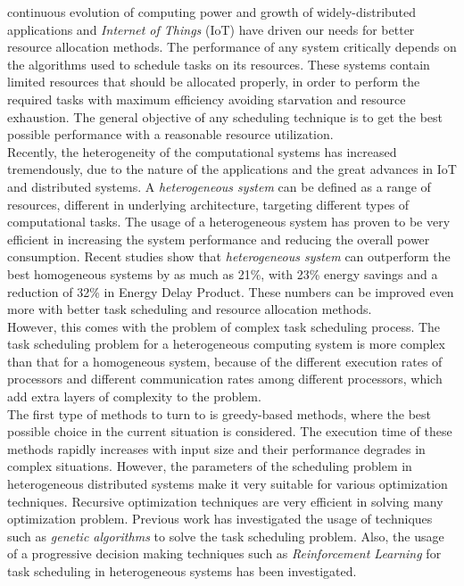  continuous evolution of computing power and growth of widely-distributed applications and \emph{Internet of Things} (IoT) \cite{inproceedings} have driven our needs for better resource allocation methods. 
The performance of any system critically depends on the algorithms used to schedule tasks on its resources. These systems contain limited resources that should be allocated properly, in order to perform the required tasks with maximum efficiency avoiding starvation and resource exhaustion. 
The general objective of any scheduling technique is to get the best possible performance with a reasonable resource utilization. \\ 

Recently, the heterogeneity of the computational systems has increased tremendously, due to the nature of the applications and the great advances in IoT and distributed systems. A \emph{heterogeneous system} can be defined as a range of resources, different in underlying architecture, targeting different types of computational tasks. The usage of a heterogeneous system has proven to be very efficient in increasing the system performance and reducing the overall power consumption. Recent studies \cite{venkat2014harnessing} show that \emph{heterogeneous system} can outperform the best homogeneous systems by as much as 21\%, with 23\% energy savings and
a reduction of 32\% in Energy Delay Product. These numbers can be improved even more with better task scheduling and resource allocation methods. \\

However, this comes with the problem of complex task scheduling process. The task scheduling problem for a heterogeneous computing system is more complex than that for a homogeneous system, because of the different execution rates of processors and different communication rates among different processors, which add extra layers of complexity to the problem. \\

The first type of methods to turn to is greedy-based methods, where the best possible choice in the current situation is considered. The execution time of these methods rapidly increases with input size and their performance degrades in complex situations. However, the parameters of the scheduling problem in heterogeneous distributed systems make it very suitable for various optimization techniques. Recursive optimization techniques are very efficient in solving many optimization problem. Previous work has investigated the usage of techniques such as \emph{genetic algorithms} \cite{article2} to solve the task scheduling problem. Also, the usage of a progressive decision making techniques such as \emph{Reinforcement Learning} \cite{ORHEAN2018292} for task scheduling in heterogeneous systems has been investigated. \\

